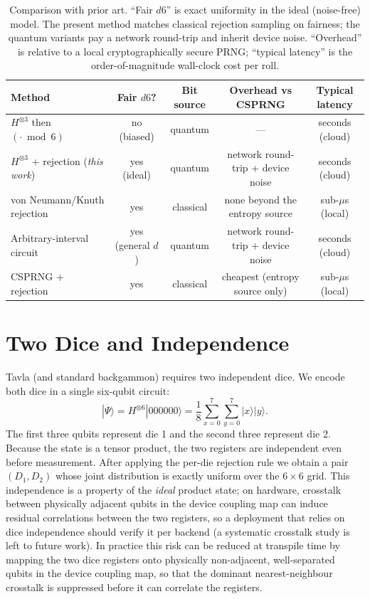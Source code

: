\documentclass[journal]{IEEEtran}
\begin{document}
\begin{table}[t]
\centering
\caption{Comparison with prior art. ``Fair $d6$'' is exact uniformity in the ideal (noise-free) model. The present method matches classical rejection sampling on fairness; the quantum variants pay a network round-trip and inherit device noise. ``Overhead'' is relative to a local cryptographically secure PRNG; ``typical latency'' is the order-of-magnitude wall-clock cost per roll.}
\label{tab:compare}
\begin{tabular}{lcccc}
\toprule
Method & Fair $d6$? & Bit source & Overhead vs CSPRNG & Typical latency \\
\midrule
$H^{\otimes 3}$ then $(\cdot \bmod 6)$ & no (biased) & quantum & --- & seconds (cloud) \\
$H^{\otimes 3}$ + rejection (\emph{this work}) & yes (ideal) & quantum & network round-trip + device noise & seconds (cloud) \\
von Neumann/Knuth rejection~\cite{vonneumann1951various,knuth1997seminumerical} & yes & classical & none beyond the entropy source & sub-$\mu$s (local) \\
Arbitrary-interval circuit~\cite{orts2023quantum} & yes (general $d$) & quantum & network round-trip + device noise & seconds (cloud) \\
CSPRNG + rejection~\cite{nist80090c} & yes & classical & cheapest (entropy source only) & sub-$\mu$s (local) \\
\bottomrule
\end{tabular}
\end{table}

\section{Two Dice and Independence}
\label{sec:two}

Tavla (and standard backgammon) requires two independent dice. We encode both dice in a single six-qubit circuit:
\begin{equation}
|\Psi\rangle = H^{\otimes 6}|000000\rangle = \frac{1}{8}\sum_{x=0}^{7}\sum_{y=0}^{7}|x\rangle|y\rangle.
\end{equation}
The first three qubits represent die 1 and the second three represent die 2. Because the state is a tensor product, the two registers are independent even before measurement. After applying the per-die rejection rule we obtain a pair $(D_1,D_2)$ whose joint distribution is exactly uniform over the $6\times 6$ grid. This independence is a property of the \emph{ideal} product state; on hardware, crosstalk between physically adjacent qubits in the device coupling map can induce residual correlations between the two registers, so a deployment that relies on dice independence should verify it per backend (a systematic crosstalk study is left to future work). In practice this risk can be reduced at transpile time by mapping the two dice registers onto physically non-adjacent, well-separated qubits in the device coupling map, so that the dominant nearest-neighbour crosstalk is suppressed before it can correlate the registers.
\end{document}
